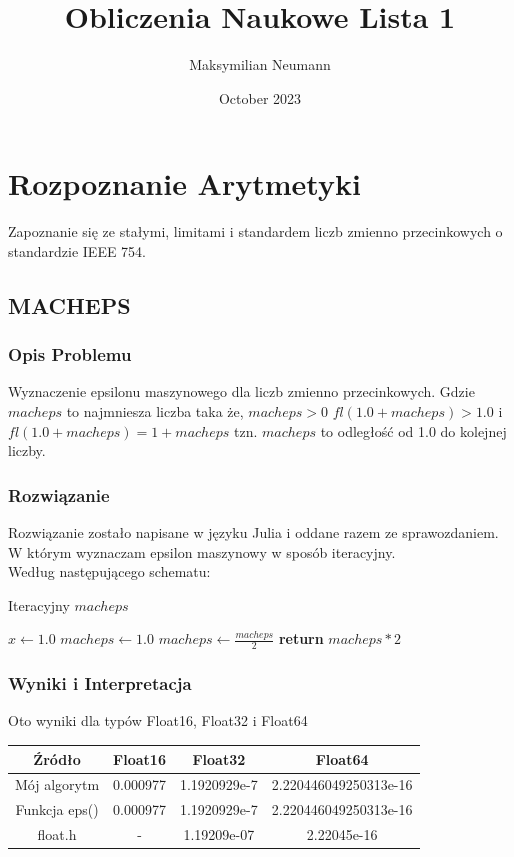 \documentclass{article}
\title{Obliczenia Naukowe Lista 1}
\author{Maksymilian Neumann}
\date{October 2023}
\begin{document}
\maketitle


\section{Rozpoznanie Arytmetyki}
    Zapoznanie się ze stałymi, limitami i standardem liczb zmienno przecinkowych o standardzie IEEE 754.
\subsection{MACHEPS}
\subsubsection{Opis Problemu}
    Wyznaczenie epsilonu maszynowego dla liczb zmienno przecinkowych. Gdzie $macheps$ to najmniesza liczba taka że, $macheps > 0$ $fl(1.0 + macheps) > 1.0$  i $fl(1.0 + macheps) = 1 + macheps$ tzn. $macheps$ to odległość od 1.0 do kolejnej liczby.
\subsubsection{Rozwiązanie}
    Rozwiązanie zostało napisane w języku Julia i oddane razem ze sprawozdaniem. W którym wyznaczam epsilon maszynowy w sposób iteracyjny.\\ Według następującego schematu:
    \begin{algorithm}
    \caption{Iteracyjny $macheps$}\label{alg:cap}
    \begin{algorithmic}
        \State $x \gets 1.0$
        \State $macheps \gets 1.0$
            \State $macheps \gets \frac{macheps}{2}$
        \EndWhile
        \State \textbf{return} $macheps * 2$
    \end{algorithmic}
    \end{algorithm}
\subsubsection{Wyniki i Interpretacja}
    Oto wyniki dla typów Float16, Float32 i Float64
    \begin{center}
        \begin{tabular}{|c||c|c|c|}
        \hline
            Źródło & Float16 & Float32 & Float64 \\
            \hline\hline
            Mój algorytm & 0.000977 & 1.1920929e-7 & 2.220446049250313e-16\\
             \hline
             Funkcja eps() & 0.000977 & 1.1920929e-7 & 2.220446049250313e-16\\
             \hline
             float.h & - & 1.19209e-07 & 2.22045e-16 \\
        \hline
        \end{tabular}
    \end{center}
\end{document}
